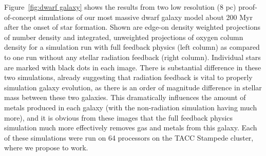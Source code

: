 \documentclass[11pt]{article}
\begin{document}
Figure~\ref{fig:dwarf galaxy} shows the results from two low resolution (8 pc) proof-of-concept simulations of our most massive dwarf galaxy model about 200 Myr after the onset of star formation. Shown are edge-on density weighted projections of number density and integrated, unweighted projections of oxygen column density for a simulation run with full feedback physics (left column) as compared to one run without any stellar radiation feedback (right column). Individual stars are marked with black dots in each image. There is substantial difference in these two simulations, already suggesting that radiation feedback is vital to properly simulation galaxy evolution, as there is an order of magnitude difference in stellar mass between these two galaxies. This dramatically influences the amount of metals produced in each galaxy (with the non-radiation simulation having much more), and it is obvious from these images that the full feedback physics simulation much more effectively removes gas and metals from this galaxy. Each of these simulations were run on 64 processors on the TACC Stampede cluster, where we propose to work. 
\end{document}
